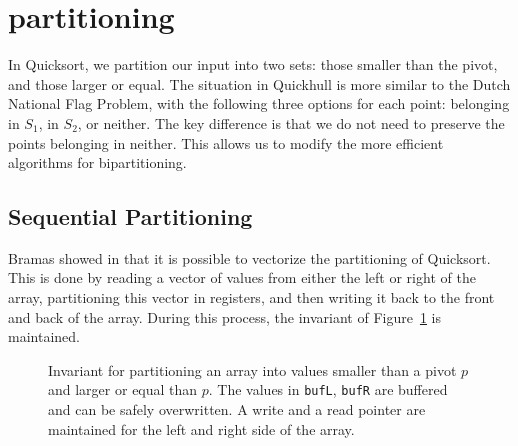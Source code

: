 \section{partitioning}

In Quicksort, we partition our input into two sets: those smaller than the 
pivot, and those larger or equal. The situation in Quickhull is more similar
to the Dutch National Flag Problem, with the following three options for each
point: belonging in $S_1$, in $S_2$, or neither. The key difference is that
we do not need to preserve the points belonging in neither. This allows us
to modify the more efficient algorithms for bipartitioning.


\subsection{Sequential Partitioning}

Bramas showed in \cite{} that it is possible to vectorize the partitioning
of Quicksort. This is done by reading a vector of values from either the
left or right of the array, partitioning this vector in registers, and
then writing it back to the front and back of the array. During this process,
the invariant of Figure~\ref{fig:invariant_bramas} is maintained.

\begin{figure}[ht]
    \caption{Invariant for partitioning an array into values smaller than
             a pivot $p$ and larger or equal than $p$. The values in
             \texttt{bufL}, \texttt{bufR} are buffered and can be safely
             overwritten. A write and a read pointer are maintained for
             the left and right side of the array.}
    \label{fig:invariant_bramas}
\end{figure}


